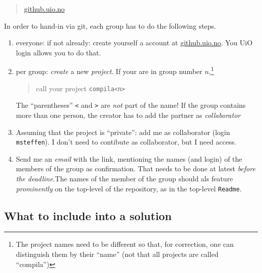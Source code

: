 \documentclass[10pt,freeform]{handout}[2014/08/13]
\begin{document}
\begin{quote}
  \url{github.uio.no}
\end{quote}


In order to hand-in via git, each group has to do the following steps.

\begin{enumerate}
\item everyone: if not already: create yourself a account at
  \url{github.uio.no}. You UiO login allows you to do that. 
\item per group: \emph{create} a new \emph{project}.  If your are in group
  number $n$,\footnote{The project names need to be different so that, for
    correction, one can distinguish them by their ``name'' (not that all
    projects are called ``compila'')}
  \begin{quote}
    call your project \texttt{compila<n>}
  \end{quote}
  The ``parentheses'' \texttt{<} and \texttt{>} are \emph{not} part of the
  name! If the group contains more than one person, the creator has to add
  the partner as \emph{collaborator} 
\item Assuming that the project is ``private'': add me as collaborator
  (login \texttt{msteffen}). I don't need to contibute as collaborator, but
  I need access.
\item Send me an \emph{email} with the link, mentioning the names (and
  login) of the members of the group as confirmation. That needs to be done
  at latest \emph{before the deadline}.The names of the member of the group should als
  feature \emph{prominently} on the top-level of the repository, as in the
  top-level \texttt{Readme}.
\end{enumerate}

\subsection{What to include into a solution}
\label{sec:what-include-into}
\end{document}
